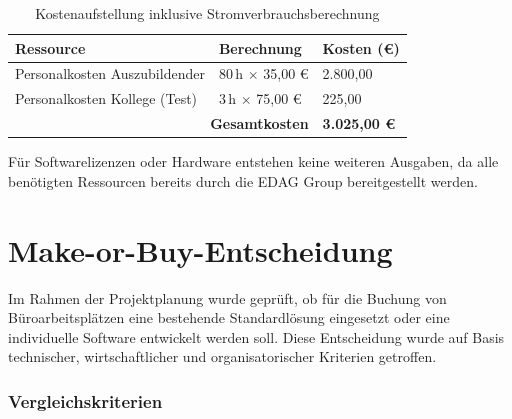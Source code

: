 \documentclass[11pt,a4paper]{report}
\begin{document}
\vspace{0.4cm}


\begin{table}[h!]
\centering
{}
\begin{tabular}{|p{6cm}|p{4cm}|p{3cm}|}
\hline
\rowcolor{headergray}
\textbf{Ressource} & \textbf{Berechnung} & \textbf{Kosten (€)} \\
\hline
Personalkosten Auszubildender & 80\,h $\times$ 35,00 € & 2.800,00 \\
Personalkosten Kollege (Test) & 3\,h $\times$ 75,00 € & 225,00 \\
\hline
\multicolumn{2}{|r|}{\textbf{Gesamtkosten}} & \textbf{3.025,00 €} \\
\hline
\end{tabular}
\caption{Kostenaufstellung inklusive Stromverbrauchsberechnung}
\end{table}

\vspace{0.3cm}

Für Softwarelizenzen oder Hardware entstehen keine weiteren Ausgaben, 
da alle benötigten Ressourcen bereits durch die EDAG Group bereitgestellt werden.

\section{Make-or-Buy-Entscheidung}

Im Rahmen der Projektplanung wurde geprüft, ob für die Buchung von Büroarbeitsplätzen 
eine bestehende Standardlösung eingesetzt oder eine individuelle Software entwickelt werden soll. 
Diese Entscheidung wurde auf Basis technischer, wirtschaftlicher und organisatorischer Kriterien getroffen.

\subsubsection*{Vergleichskriterien}
\end{document}
